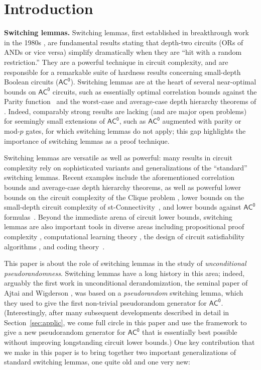 \documentclass{toc}
\theoremstyle{plain}
\newcommand{\acz}{\mathsf{AC^0}}
\begin{document}
%
%
%



\section{Introduction} 

{\bf Switching lemmas.}  Switching lemmas, first established in
%
breakthrough work %
%
in the 1980s \cite{ajtai1983,FSS:84,yao1985,Hastad86}, are fundamental results stating that depth-two circuits (ORs of ANDs or vice versa) simplify dramatically when they are ``hit with a random restriction.''  They are a powerful technique in circuit complexity, and are responsible for a remarkable suite of hardness results concerning small-depth Boolean circuits ($\acz$). Switching lemmas are at the heart of several near-optimal bounds on $\acz$ circuits, such as essentially optimal correlation bounds against the {\sc Parity} function~\cite{IMP12,Has14} and the worst-case and average-case depth hierarchy theorems of \cite{Hastad86,RST15,Hastad16}.  Indeed, comparably strong results are lacking (and are major open problems) for seemingly small extensions of $\acz$, such as $\acz$ augmented with parity or mod-$p$ gates, for which switching lemmas do not apply; this gap highlights the importance of switching lemmas as a proof technique.

Switching lemmas are versatile as well as powerful:  many results in circuit complexity rely on sophisticated variants and generalizations of the ``standard'' switching lemmas.  Recent examples include
the aforementioned correlation bounds and average-case depth hierarchy theorems, as well as powerful lower bounds on the circuit complexity of the {\sc Clique} problem \cite{Beame90,Rossman08}, lower bounds on the small-depth circuit complexity of {\sc st-Connectivity}~\cite{COST16}, and lower bounds against $\acz$ formulas~\cite{Rossman18}. Beyond the immediate arena of circuit lower bounds, switching lemmas are also important tools in diverse areas including propositional proof complexity \cite{PBI93,KPW94,PRST16,Hastad17}, computational learning theory \cite{LMN:93},  the design of circuit satisfiability algorithms \cite{BIS12,IMP12}, and coding theory~\cite{CL17,BDGMT18}.

This paper is about the role of switching lemmas in the study of \emph{unconditional pseudorandomness}.  Switching lemmas have a long history in this area; indeed, arguably the first work in unconditional derandomization, the seminal paper of Ajtai and Wigderson \cite{AjtaiWigderson:85}, was based on a \emph{pseudorandom} switching lemma, which they used to give the first non-trivial pseudorandom generator for $\acz$.  (Interestingly, after many subsequent developments described in detail in Section~\ref{sec:applic}, we come full circle in this paper and use the \cite{AjtaiWigderson:85} framework to give a new pseudorandom generator for $\acz$ that is essentially best possible without improving longstanding circuit lower bounds.)  One key contribution that we make in this paper is to bring together two important generalizations of standard switching lemmas, one quite old and one very new:
\end{document}
